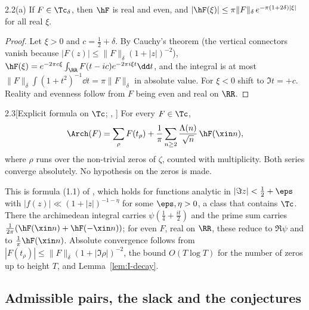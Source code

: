 \begin{Ilemma}{2.2(a)}\label{lem:I-decay}
If $F\in\Tc_\delta$, then $\hF$ is real and even, and $|\hF(\xi)|\le\pi\|F\|_\delta\,e^{-\pi(1+2\delta)|\xi|}$ for all real $\xi$.
\end{Ilemma}

\begin{proof}
Let $\xi>0$ and $c=\frac12+\delta$. By Cauchy's theorem (the vertical connectors vanish because $|F(z)|\le\|F\|_\delta(1+|z|)^{-2}$),
$\hF(\xi)=e^{-2\pi c\xi}\int_\RR F(t-ic)e^{-2\pi i\xi t}\dd t$, and the integral is at most $\|F\|_\delta\int(1+t^2)^{-1}\dd t=\pi\|F\|_\delta$ in
absolute value. For $\xi<0$ shift to $\Im t=+c$. Reality and evenness follow from $F$ being even and real on $\RR$.
\end{proof}

\begin{Ilemma}{2.3}[Explicit formula on $\Tc$; \cite{Wei52}, {\cite[(1.1)]{BRS}}]\label{lem:I-EF}
For every $F\in\Tc$,
\begin{equation}\label{eq:EF}
\Arch(F)=\sum_\rho F(t_\rho)+\frac1\pi\sum_{n\ge2}\frac{\Lambda(n)}{\sqrt n}\,\hF(\xin n),
\end{equation}
where $\rho$ runs over the non-trivial zeros of $\zeta$, counted with multiplicity. Both series converge absolutely. No hypothesis on the zeros
is made.
\end{Ilemma}

This is formula (1.1) of \cite{BRS}, which holds for functions analytic in $|\Im z|<\frac12+\eps$ with $|f(z)|\ll(1+|z|)^{-1-\eta}$ for some
$\eps,\eta>0$, a class that contains $\Tc$. There the archimedean integral carries $\psi(\frac14+\frac{it}2)$ and the prime sum carries
$\frac1{2\pi}(\hF(\xin n)+\hF(-\xin n))$; for even $F$, real on $\RR$, these reduce to $\Re\psi$ and to $\frac1\pi\hF(\xin n)$. Absolute convergence
follows from $|F(t_\rho)|\le\|F\|_\delta(1+|\Im\rho|)^{-2}$, the bound $O(T\log T)$ for the number of zeros up to height $T$, and
Lemma~\ref{lem:I-decay}.

\subsection{Admissible pairs, the slack and the conjectures}

